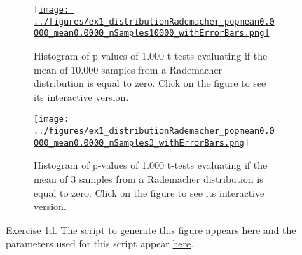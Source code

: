 \documentclass[12pt]{article}
\def\fig_width{3.5in}
\begin{document}
\begin{enumerate}[(a)]
        \begin{figure}[H]
            \begin{center}

                \begin{subfigure}{1.0\textwidth}
                    \centering
                    \href{https://www.gatsby.ucl.ac.uk/~rapela/neuroinformatics/2023/ws1/figures/ex1_distributionRademacher_popmean0.0000_mean0.0000_nSamples10000_withErrorBars.html}{\texttt{[image: ../figures/ex1\_distributionRademacher\_popmean0.0000\_mean0.0000\_nSamples10000\_withErrorBars.png]}}

                    \caption{Histogram of p-values of 1.000 t-tests evaluating
                    if the mean of 10.000 samples from a Rademacher
                    distribution is equal to zero.  Click on the figure to see
                    its interactive version.}

                    \label{fig:ex1d_1}
                \end{subfigure}

                \begin{subfigure}{1.0\textwidth}
                    \centering
                    \href{https://www.gatsby.ucl.ac.uk/~rapela/neuroinformatics/2023/ws1/figures/ex1_distributionRademacher_popmean0.0000_mean0.0000_nSamples3_withErrorBars.html}{\texttt{[image: ../figures/ex1\_distributionRademacher\_popmean0.0000\_mean0.0000\_nSamples3\_withErrorBars.png]}}

                    \caption{Histogram of p-values of 1.000 t-tests evaluating if the mean
                    of 3 samples from a Rademacher distribution is equal to zero.
                    Click on the figure to see its interactive version.}

                    \label{fig:ex1d_2}
                \end{subfigure}

                \caption{Exercise 1d.
                The script to generate this figure appears
                \href{https://github.com/joacorapela/neuroinformatics23/blob/master/worksheets/ws1/mySolution/code/scripts/doEx1WithErrorBars.py}{here} and the
                parameters used for this script appear
                \href{https://github.com/joacorapela/neuroinformatics23/blob/master/worksheets/ws1/mySolution/code/scripts/doEx1dWithErrorBars.csh}{here}.}
                \label{fig:ex1d}

            \end{center}
        \end{figure}


\end{enumerate}
\end{document}
